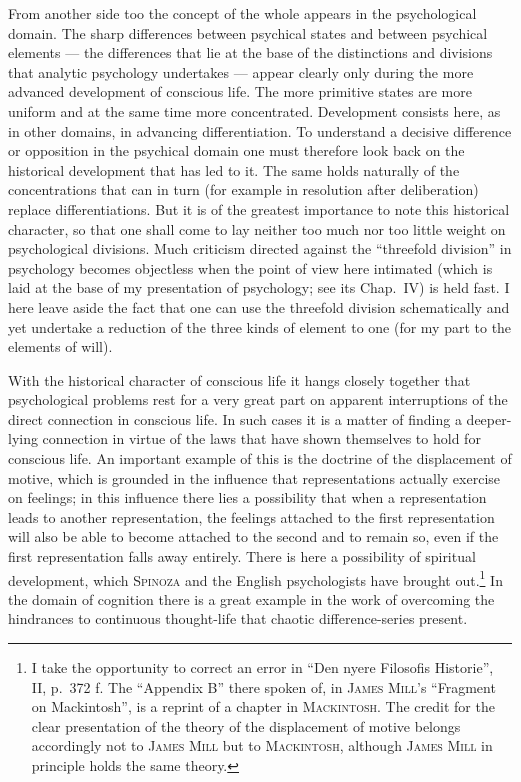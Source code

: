 \documentclass[12pt]{book}
\begin{document}
From another side too the concept of the whole appears in the psychological domain.
The sharp differences between psychical states and between psychical elements --- the
differences that lie at the base of the distinctions and divisions that analytic
psychology undertakes --- appear clearly only during the more advanced development of
conscious life. The more primitive states are more uniform and at the same time more
concentrated. Development consists here, as in other domains, in advancing
differentiation. To understand a decisive difference or opposition in the psychical
domain one must therefore look back on the historical development that has led to it.
The same holds naturally of the concentrations that can in turn (for example in
resolution after deliberation) replace differentiations. But it is of the greatest
importance to note this historical character, so that one shall come to lay neither too
much nor too little weight on psychological divisions. Much criticism directed against
the ``threefold division'' in psychology becomes objectless when the point of view here
intimated (which is laid at the base of my presentation of psychology; see its Chap.\
IV) is held fast. I here leave aside the fact that one can use the threefold division
schematically and yet undertake a reduction of the three kinds of element to one (for
my part to the elements of will).

With the historical character of conscious life it hangs closely together that
psychological problems rest for a very great part on apparent interruptions of the
direct connection in conscious life. In such cases it is a matter of finding a
deeper-lying connection in virtue of the laws that have shown themselves to hold for
conscious life. An important example of this is the doctrine of the displacement of
motive, which is grounded in the influence that representations actually exercise on
feelings; in this influence there lies a possibility that when a representation leads
to another representation, the feelings attached to the first representation will also
be able to become attached to the second and to remain so, even if the first
representation falls away entirely. There is here a possibility of spiritual
development, which \textsc{Spinoza} and the English psychologists have brought
out.\footnote{I take the opportunity to correct an error in ``Den nyere Filosofis
Historie'', II, p.\ 372 f. The ``Appendix B'' there spoken of, in \textsc{James
Mill}'s ``Fragment on Mackintosh'', is a reprint of a chapter in
\textsc{Mackintosh}. The credit for the clear presentation of the theory of the
displacement of motive belongs accordingly not to \textsc{James Mill} but to
\textsc{Mackintosh}, although \textsc{James Mill} in principle holds the same
theory.} In the domain of
cognition there is a great example in the work of overcoming the hindrances to
continuous thought-life that chaotic difference-series present.
\end{document}
